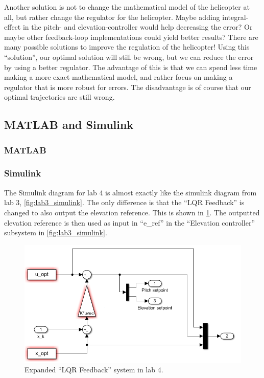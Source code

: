 \documentclass[../main.tex]{subfiles}
\begin{document}
Another solution is not to change the mathematical model of the helicopter at all, but rather change the regulator for the helicopter. Maybe adding integral-effect in the pitch- and elevation-controller would help decreasing the error? Or maybe other feedback-loop implementations could yield better results? There are many possible solutions to improve the regulation of the helicopter! Using this ``solution'', our optimal solution will still be wrong, but we can reduce the error by using a better regulator. The advantage of this is that we can spend less time making a more exact mathematical model, and rather focus on making a regulator that is more robust for errors. The disadvantage is of course that our optimal trajectories are still wrong.

\subsection{MATLAB and Simulink}
\subsubsection{MATLAB}

\subsubsection{Simulink}
The Simulink diagram for lab 4 is almost exactly like the simulink diagram from lab 3, \cref{fig:lab3_simulink}. The only difference is that the ``LQR Feedback'' is changed to also output the elevation reference. This is shown in \cref{fig:lab4_simulink_lqr}. The outputted elevation reference is then used as input in ``e\_ref'' in the ``Elevation controller'' subsystem in \cref{fig:lab3_simulink}. 
\begin{figure}[h]
	\centering
	\includegraphics[width=1\linewidth, keepaspectratio]{code/lab4_simulink_2}
	\caption{Expanded ``LQR Feedback'' system in lab 4.}
	\label{fig:lab4_simulink_lqr}
\end{figure}
\end{document}
